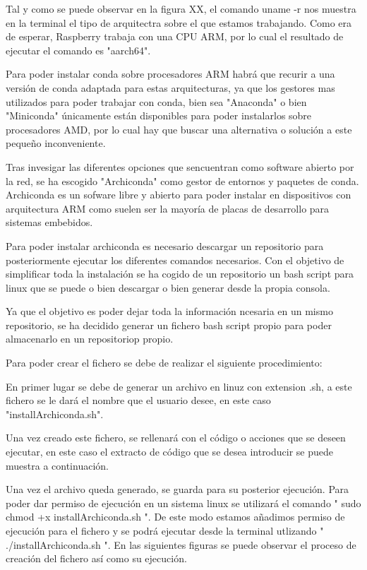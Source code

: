 Tal y como se puede observar en la figura XX, el comando uname -r nos muestra en la terminal el tipo de arquitectra sobre el que estamos trabajando. Como era de esperar, Raspberry trabaja con una CPU ARM, por lo cual el resultado de ejecutar el comando es "aarch64".

Para poder instalar conda sobre procesadores ARM habrá que recurir a una versión de conda adaptada para estas arquitecturas, ya que los gestores mas utilizados para poder trabajar con conda, bien sea "Anaconda" o bien "Miniconda" únicamente están disponibles para poder instalarlos sobre procesadores AMD, por lo cual hay que buscar una alternativa o solución a este pequeño inconveniente.

Tras invesigar las diferentes opciones que sencuentran como software abierto por la red, se ha escogido "Archiconda" como gestor de entornos y paquetes de conda. Archiconda es un sofware libre y abierto para poder instalar en dispositivos con arquitectura ARM como suelen ser la mayoría de placas de desarrollo para sistemas embebidos.

Para poder instalar archiconda es necesario descargar un repositorio para posteriormente ejecutar los diferentes comandos necesarios. Con el objetivo de simplificar toda la instalación se ha cogido de un repositorio un bash script para linux que se puede o bien descargar o bien generar desde la propia consola.

Ya que el objetivo es poder dejar toda la información ncesaria en un mismo repositorio, se ha decidido generar un fichero bash script propio para poder almacenarlo en un repositoriop propio.

Para poder crear el fichero se debe de realizar el siguiente procedimiento:

En primer lugar se debe de generar un archivo en linuz con extension .sh, a este fichero se le dará el nombre que el usuario desee, en este caso "installArchiconda.sh".

Una vez creado este fichero, se rellenará con el código o acciones que se deseen ejecutar, en este caso el extracto de código que se desea introducir se puede muestra a continuación.

Una vez el archivo queda generado, se guarda para su posterior ejecución. Para poder dar permiso de ejecución en un sistema linux se utilizará el comando " sudo chmod +x installArchiconda.sh ". De este modo estamos añadimos permiso de ejecución para el fichero y se podrá ejecutar desde la terminal utlizando " ./installArchiconda.sh ". En las siguientes figuras se puede observar el proceso de creación del fichero así como su ejecución.


